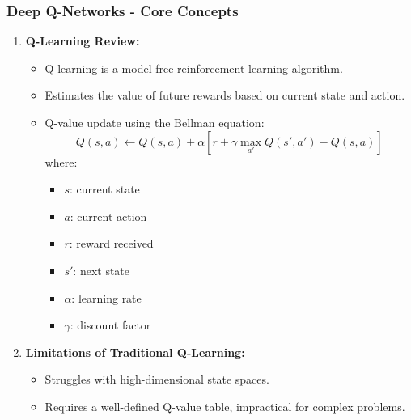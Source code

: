 \documentclass[aspectratio=169]{beamer}
\begin{document}
\begin{frame}[fragile]
    \frametitle{Deep Q-Networks - Core Concepts}
    \begin{enumerate}
        \item \textbf{Q-Learning Review:}
        \begin{itemize}
            \item Q-learning is a model-free reinforcement learning algorithm.
            \item Estimates the value of future rewards based on current state and action.
            \item Q-value update using the Bellman equation:
            \begin{equation}
                Q(s, a) \leftarrow Q(s, a) + \alpha \left[ r + \gamma \max_{a'} Q(s', a') - Q(s, a) \right]
            \end{equation}
            where:
            \begin{itemize}
                \item \( s \): current state
                \item \( a \): current action
                \item \( r \): reward received
                \item \( s' \): next state
                \item \( \alpha \): learning rate
                \item \( \gamma \): discount factor
            \end{itemize}
        \end{itemize}
        
        \item \textbf{Limitations of Traditional Q-Learning:}
        \begin{itemize}
            \item Struggles with high-dimensional state spaces.
            \item Requires a well-defined Q-value table, impractical for complex problems.
        \end{itemize}
    \end{enumerate}
\end{frame}
\end{document}
